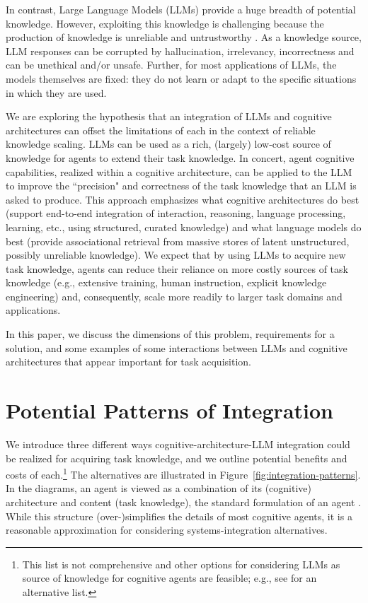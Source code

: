 \documentclass[letterpaper]{article} %
\begin{document}
In contrast, Large Language Models (LLMs) \cite{openai_gpt-4_2023,driess_palm-e_2023} provide a huge breadth of potential knowledge. However, exploiting this knowledge is challenging because the production of knowledge is unreliable and untrustworthy \citep{lenat_getting_2023}. As a knowledge source, LLM responses can be corrupted by hallucination, irrelevancy, incorrectness and can be unethical and/or unsafe. Further, for most applications of LLMs, the models themselves are fixed: they do not learn or adapt to the specific situations in which they are used.

We are exploring the hypothesis that an integration of LLMs and cognitive architectures can offset the limitations of each in the context of reliable knowledge scaling. LLMs can be used as a rich, (largely) low-cost source of knowledge for agents to extend their task knowledge. In concert, agent cognitive capabilities, realized within a cognitive architecture, can be applied to the LLM to improve the ``precision" and correctness of the task knowledge that an LLM is asked to produce.
This approach emphasizes what cognitive architectures do best (support end-to-end integration of interaction, reasoning, language processing, learning, etc., using structured, curated knowledge) and what language models do best (provide associational retrieval from massive stores of latent unstructured, possibly unreliable knowledge). We expect that by using LLMs to acquire new task knowledge, agents can reduce their reliance on more costly sources of task knowledge (e.g., extensive training, human instruction, explicit knowledge engineering) and, consequently, scale more readily to larger task domains and applications.

In this paper, we discuss the dimensions of this problem, requirements for a solution, and some examples of some interactions between LLMs and cognitive architectures that appear important for task acquisition.

\section{Potential Patterns of Integration}

We introduce three different ways cognitive-architecture-LLM integration could be realized for acquiring task knowledge, and we outline potential benefits and costs of each.\footnote{This list is not comprehensive and other options for considering LLMs as source of knowledge for cognitive agents are feasible; e.g., see  \citet{lenat_getting_2023} for an alternative list.} The alternatives are illustrated in Figure~\ref{fig:integration-patterns}. In the diagrams, an agent is viewed as a combination of its (cognitive) architecture and content (task knowledge), the standard formulation of an agent \cite{russell_artificial_1995}. While this structure (over-)simplifies the details of most cognitive agents, it is a reasonable approximation for considering systems-integration alternatives.
\end{document}
